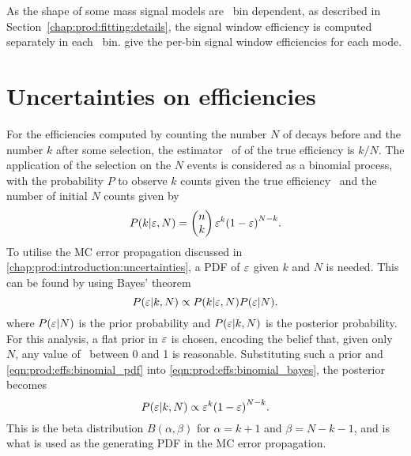 As the shape of some mass signal models are \pTy\ bin dependent, as described 
in Section~\ref{chap:prod:fitting:details}, the signal window efficiency is computed 
separately in each \pTy\ bin.
give the per-bin signal window efficiencies for each mode.

\section{Uncertainties on efficiencies}
\label{chap:prod:effs:tot}


For the efficiencies computed by counting the number $N$ of decays before and 
the number $k$ after some selection, the estimator \effest\ of of the true 
efficiency is $k/N$.
The application of the selection on the $N$ events is considered as a binomial 
process, with the probability $P$ to observe $k$ counts given the true 
efficiency \eff\ and the number of initial $N$ counts given by
\begin{equation}
  P(k | \varepsilon, N) = \begin{pmatrix}n\\k\end{pmatrix}\varepsilon^{k}{(1 - \varepsilon)}^{N - k}.
  \label{eqn:prod:effs:binomial_pdf}
\end{equation}
To utilise the \ac{MC} error propagation discussed in 
\cref{chap:prod:introduction:uncertainties}, a \ac{PDF} of $\varepsilon$ given $k$ and 
$N$ is needed.
This can be found by using Bayes' theorem
\begin{equation}
  P(\varepsilon | k, N) \propto P(k | \varepsilon, N)P(\varepsilon |N).
  \label{eqn:prod:effs:binomial_bayes}
\end{equation}
where $P(\varepsilon | N)$ is the prior probability and $P(\varepsilon | k, N)$ is the 
posterior probability.
For this analysis, a flat prior in $\varepsilon$ is chosen, encoding the belief that, 
given only $N$, any value of \eff\ between 0 and 1 is reasonable.
Substituting such a prior and \cref{eqn:prod:effs:binomial_pdf} into 
\cref{eqn:prod:effs:binomial_bayes}, the posterior becomes
\begin{equation}
  P(\varepsilon | k, N) \propto \varepsilon^{k}{(1 - \varepsilon)}^{N - k}.
\end{equation}
This is the beta distribution $B(\alpha, \beta)$ for $\alpha = k + 1$ and 
$\beta = N - k - 1$, and is what is used as the generating \ac{PDF} in the 
\ac{MC} error propagation.

